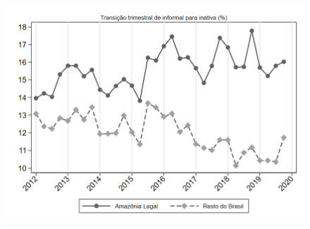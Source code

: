 \begin{frame}[label=_transicao_ocupacao_sh_informal_sh_inativa]{}
\textit{\hyperlink{_transicao_ocupacao}{}}
\begin{figure}
  \centering
  \includegraphics[width=1.0\linewidth]{../../analysis/output/transicao_ocupacao/_transicao_ocupacao_sh_informal_sh_inativa.png}
  \caption{}
  \label{fig:_transicao_ocupacao_sh_informal_sh_inativa}
\end{figure}
\end{frame}
